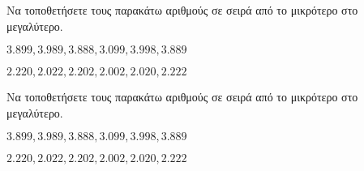 Να τοποθετήσετε τους παρακάτω αριθμούς σε σειρά από το μικρότερο στο μεγαλύτερο.
\begin{rlist}
\item $ 3.899, 3.989,3.888,3.099,3.998,3.889 $
\item $ 2.220,2.022,2.202,2.002,2.020,2.222 $
\end{rlist}
Να τοποθετήσετε τους παρακάτω αριθμούς σε σειρά από το μικρότερο στο μεγαλύτερο.
\begin{rlist}
\item $ 3.899, 3.989,3.888,3.099,3.998,3.889 $
\item $ 2.220,2.022,2.202,2.002,2.020,2.222 $
\end{rlist}
